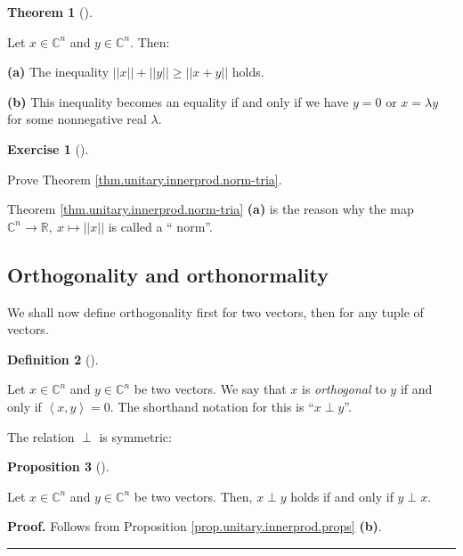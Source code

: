 \documentclass[numbers=enddot,12pt,final,onecolumn,notitlepage]{scrartcl}%
\newcounter{exer}
\numberwithin{exer}{subsection}
\theoremstyle{definition}
\newtheorem{theo}{Theorem}[subsection]
\newenvironment{theorem}[1][]
{\begin{theo}[#1]\begin{leftbar}}
{\end{leftbar}\end{theo}}
\newtheorem{prop}[theo]{Proposition}
\newenvironment{proposition}[1][]
{\begin{prop}[#1]\begin{leftbar}}
{\end{leftbar}\end{prop}}
\newtheorem{defi}[theo]{Definition}
\newenvironment{definition}[1][]
{\begin{defi}[#1]\begin{leftbar}}
{\end{leftbar}\end{defi}}
\newtheorem{exmp}[exer]{Exercise}
\newenvironment{exercise}[1][]
{\begin{exmp}[#1]\begin{leftbar}}
{\end{leftbar}\end{exmp}}
\newenvironment{proof}[1][Proof]{\noindent\textbf{#1.} }{\ \rule{0.5em}{0.5em}}
\begin{document}
\begin{theorem}
[triangle inequality]\label{thm.unitary.innerprod.norm-tria} Let
$x\in\mathbb{C}^{n}$ and $y\in\mathbb{C}^{n}$. Then: \medskip

\textbf{(a)} The inequality $\left\vert \left\vert x\right\vert \right\vert
+\left\vert \left\vert y\right\vert \right\vert \geq\left\vert \left\vert
x+y\right\vert \right\vert $ holds. \medskip

\textbf{(b)} This inequality becomes an equality if and only if we have $y=0$
or $x=\lambda y$ for some nonnegative real $\lambda$.
\end{theorem}

\begin{exercise}
\label{exe.unitary.innerprod.norm-tria} Prove Theorem
\ref{thm.unitary.innerprod.norm-tria}.
\end{exercise}

Theorem \ref{thm.unitary.innerprod.norm-tria} \textbf{(a)} is the reason why
the map $\mathbb{C}^{n}\rightarrow\mathbb{R},\ x\mapsto\left\vert \left\vert
x\right\vert \right\vert $ is called a \textquotedblleft
norm\textquotedblright.

\subsection{Orthogonality and orthonormality}

We shall now define orthogonality first for two vectors, then for any tuple of vectors.

\begin{definition}
\label{def.unitary.innerprod.orth}Let $x\in\mathbb{C}^{n}$ and $y\in
\mathbb{C}^{n}$ be two vectors. We say that $x$ is \emph{orthogonal} to $y$ if
and only if $\left\langle x,y\right\rangle =0$. The shorthand notation for
this is \textquotedblleft$x\perp y$\textquotedblright.
\end{definition}

The relation $\perp$ is symmetric:

\begin{proposition}
\label{prop.unitary.innerprod.orth-symm}Let $x\in\mathbb{C}^{n}$ and
$y\in\mathbb{C}^{n}$ be two vectors. Then, $x\perp y$ holds if and only if
$y\perp x$.
\end{proposition}

\begin{proof}
Follows from Proposition \ref{prop.unitary.innerprod.props} \textbf{(b)}.
\end{proof}
\end{document}
